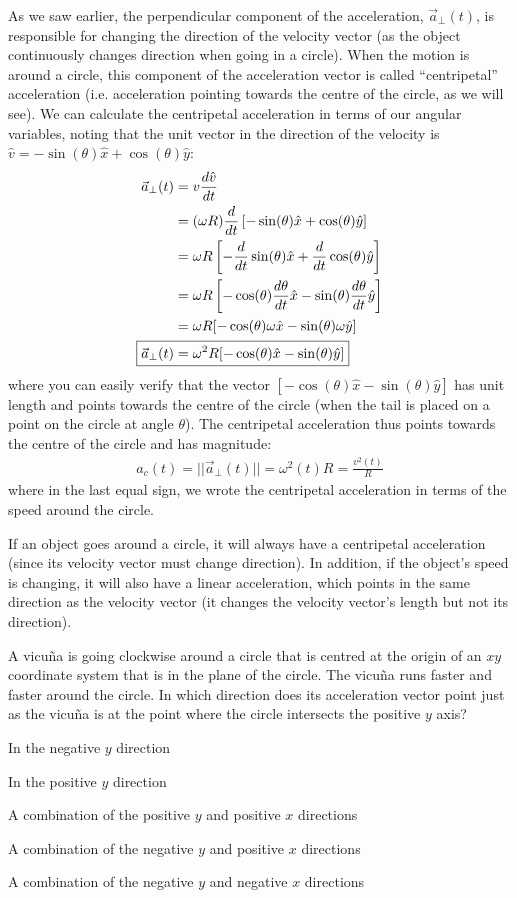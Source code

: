 As we saw earlier, the perpendicular component of the acceleration, $\vec a_{\bot}(t)$, is responsible for changing the direction of the velocity vector (as the object continuously changes direction when going in a circle). When the motion is around a circle, this component of the acceleration vector is called ``centripetal'' acceleration (i.e. acceleration pointing towards the centre of the circle, as we will see). We can calculate the centripetal acceleration in terms of our angular variables, noting that the unit vector in the direction of the velocity is $\hat v=-\sin(\theta)\hat x+\cos(\theta)\hat y$:
\begin{align}
\vec a_{\bot}(t)&=v\frac{d\hat v}{dt}\nonumber\\
&=(\omega R)\ddt \left[-\sin(\theta)\hat x+\cos(\theta)\hat y\right]\nonumber\\
&=\omega R \left[-\ddt\sin(\theta)\hat x+\ddt\cos(\theta)\hat y\right]\nonumber\\
&=\omega R \left[-\cos(\theta)\frac{d\theta}{dt}\hat x-\sin(\theta)\frac{d\theta}{dt}\hat y\right]\nonumber\\
&=\omega R [-\cos(\theta)\omega\hat x-\sin(\theta)\omega\hat y]\nonumber\\
\Aboxed{\vec a_{\bot}(t)&=\omega^2 R[-\cos(\theta)\hat x-\sin(\theta)\hat y]}
\end{align}
where you can easily verify that the vector $[-\cos(\theta)\hat x-\sin(\theta)\hat y]$ has unit length and points towards the centre of the circle (when the tail is placed on a point on the circle at angle $\theta$). The centripetal acceleration thus points towards the centre of the circle and has magnitude:
\begin{align}
a_c(t) = ||\vec a_{\bot}(t)||=\omega^2(t) R = \frac{v^2(t)}{R}
\end{align}
where in the last equal sign, we wrote the centripetal acceleration in terms of the speed around the circle.

If an object goes around a circle, it will always have a centripetal acceleration (since its velocity vector must change direction). In addition, if the object's speed is changing, it will also have a linear acceleration, which points in the same direction as the velocity vector (it changes the velocity vector's length but not its direction).

\begin{checkpointMC}{A vicu\~na is going clockwise around a circle that is centred at the origin of an $xy$ coordinate system that is in the plane of the circle. The vicu\~na runs faster and faster around the circle. In which direction does its acceleration vector point just as the vicu\~na is at the point where the circle intersects the positive $y$ axis?}
\item In the negative $y$ direction
\item In the positive $y$ direction
\item A combination of the positive $y$ and positive $x$ directions
\item A combination of the negative $y$ and positive $x$ directions %
\item A combination of the negative $y$ and negative $x$ directions
\end{checkpointMC}

